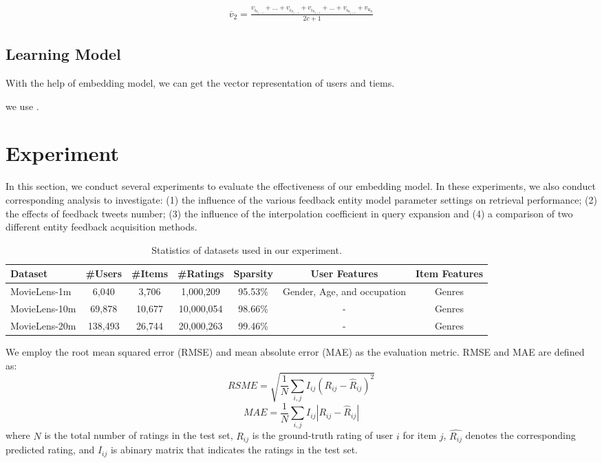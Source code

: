 \documentclass{sig-alternate-05-2015}
\begin{document}
\begin{equation}
\begin{aligned}
	\overline{v}_{2} = \frac{ v_{i_{n_{j-c}}} + ... + v_{i_{n_{j-1}}} + 
	v_{i_{n_{j+1}}} + ... + v_{i_{n_{j+c}}} + v_{u_n} }{2c+1}
\end{aligned}
\end{equation}


\subsection{Learning Model}
With the help of embedding model, we can get the vector representation of users and tiems.


we use \cite{chen2012svdfeature}.


\section{Experiment}
In this section, we conduct several experiments to evaluate the effectiveness of our embedding model.
In these experiments, we also conduct corresponding analysis to investigate:
(1) the influence of the various feedback entity model parameter settings on
retrieval performance;
(2) the effects of feedback tweets number;
(3) the influence of the interpolation coefficient in query expansion and
(4) a comparison of two different entity feedback acquisition methods.



\begin{table}[htpb]
	\centering
	\caption{Statistics of datasets used in our experiment.}
	\label{tab:topics}
	\begin{tabular}{|l|c|c|c|c|c|c|}
		\hline
		\textbf{Dataset} & \textbf{\#Users} & \textbf{\#Items} & \textbf{\#Ratings} & \textbf{Sparsity} & \textbf{User Features} & \textbf{Item Features} \\
		\hline
		MovieLens-1m  & 6,040   & 3,706  & 1,000,209  & 95.53\% & Gender, Age, and occupation & Genres \\
		MovieLens-10m & 69,878  & 10,677 & 10,000,054 & 98.66\% & - & Genres \\
		MovieLens-20m & 138,493 & 26,744 & 20,000,263 & 99.46\% & - & Genres \\
		\hline
	\end{tabular}
\end{table}



We employ the root mean squared error (RMSE) and mean absolute error (MAE) as the evaluation metric.
RMSE and MAE are defined as:
$$ RSME = \sqrt{ \frac{1}{N} \sum_{i,j} I_{ij} (R_{ij} - \hat{R}_{ij})^2 } $$
$$ MAE = \frac{1}{N} \sum_{i,j} I_{ij} |R_{ij} - \hat{R}_{ij}| $$
where $N$ is the total number of ratings in the test set,
$R_{ij}$ is the ground-truth rating of user $i$ for item $j$,
$\hat{R_{ij}}$ denotes the corresponding predicted rating,
and $I_{ij}$ is abinary matrix that indicates the ratings in the test set.
\end{document}
